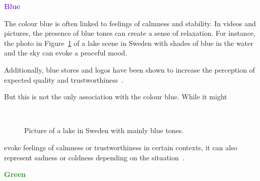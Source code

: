 \documentclass[../MasterThesis.tex]{subfiles}
\begin{document}
\newpage
\textbf{\textcolor{BlueViolet}{Blue}}

%
\begin{minipage}{0.45\textwidth}
	The colour blue is often linked to feelings of calmness and stability. In videos and pictures, the presence of blue tones can create a sense of relaxation. For instance, the photo in Figure~\ref{figure:blue} of a lake scene in Sweden with shades of blue in the water and the sky can evoke a peaceful mood.
	
	Additionally, blue stores and logos have been shown to increase the perception of expected quality and trustworthiness~\cite{blue_trust, colour2}.
	
	But this is not the only association with the colour blue. While it might
	
	
	
\end{minipage}\begin{minipage}{0.05\textwidth}
	\ 
\end{minipage}\begin{minipage}{0.5\textwidth}
	\begin{figure}[H]
		\begin{center}
			\caption[Picture of a lake in Sweden with mainly blue tones.]{Picture of a lake in Sweden with mainly blue tones.}
			\label{figure:blue}
		\end{center}
	\end{figure}\hfill
\end{minipage}
%

\vspace*{-0.2em}
evoke feelings of calmness or trustworthiness in certain contexts, it can also represent sadness or coldness depending on the situation~\cite{colour2}.


\textbf{\textcolor{ForestGreen}{Green}}
\end{document}
